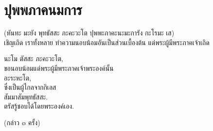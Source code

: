 \documentclass{article}
\begin{document}
\pagebreak
\section{ปุพพภาคนมการ}
\begin{center}
(หันทะ มะยัง พุทธัสสะ ภะคะวะโต ปุพพะภาคะนะมะการัง กะโรมะ เส)\\
เชิญเถิด เราทั้งหลาย ทำความนอบน้อมอันเป็นส่วนเบื้องต้น แด่พระผู้มีพระภาคเจ้าเถิด
\end{center}
นะโม ตัสสะ ภะคะวะโต,\\
\indent ขอนอบน้อมแด่พระผู้มีพระภาคเจ้าพระองค์นั้น\\
อะระหะโต,\\
\indent ซึ่งเป็นผู้ไกลจากกิเลส\\
สัมมาสัมพุทธัสสะ.\\
\indent ตรัสรู้ชอบได้โดยพระองค์เอง.	
\begin{center}
(กล่าว ๓ ครั้ง)
\end{center}

\pagebreak
\end{document}
